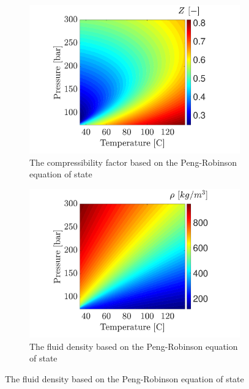 \documentclass[../Article_Design_of_Experiment.tex]{subfiles}
\begin{document}
		\begin{figure}[H]
			\begin{subfigure}[b]{0.95\textwidth}
				\centering
				\includegraphics[trim = 2.9cm 7cm 3cm 7cm,clip,width=\textwidth]{Figures/Compressibility.pdf}	
				\caption{The compressibility factor based on the Peng-Robinson equation of state}
                \label{fig: SFE_Properties_Compressibility}
			\end{subfigure}
			\hfill
			\begin{subfigure}[b]{0.95\textwidth}
				\centering
				\includegraphics[trim = 2.9cm 7cm 3cm 7cm,clip,width=\textwidth]{Figures/RHO.pdf}	
				\caption{The fluid density based on the Peng-Robinson equation of state}
                \label{fig: SFE_Properties_Density}
			\end{subfigure}

\end{figure}
\end{document}
